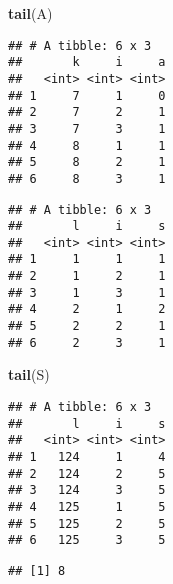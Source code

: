 \documentclass[
]{book}
\newenvironment{Shaded}{\begin{snugshade}}{\end{snugshade}}
\newcommand{\CommentTok}[1]{\textcolor[rgb]{0.56,0.35,0.01}{\textit{#1}}}
\newcommand{\FunctionTok}[1]{\textcolor[rgb]{0.13,0.29,0.53}{\textbf{#1}}}
\newcommand{\NormalTok}[1]{#1}
\newcommand{\OtherTok}[1]{\textcolor[rgb]{0.56,0.35,0.01}{#1}}
\newcommand{\SpecialCharTok}[1]{\textcolor[rgb]{0.81,0.36,0.00}{\textbf{#1}}}
\begin{document}
\begin{Shaded}
\begin{Highlighting}[]
\FunctionTok{tail}\NormalTok{(A)}
\end{Highlighting}
\end{Shaded}

\begin{verbatim}
## # A tibble: 6 x 3
##       k     i     a
##   <int> <int> <int>
## 1     7     1     0
## 2     7     2     1
## 3     7     3     1
## 4     8     1     1
## 5     8     2     1
## 6     8     3     1
\end{verbatim}

\begin{Shaded}
\end{Shaded}

\begin{verbatim}
## # A tibble: 6 x 3
##       l     i     s
##   <int> <int> <int>
## 1     1     1     1
## 2     1     2     1
## 3     1     3     1
## 4     2     1     2
## 5     2     2     1
## 6     2     3     1
\end{verbatim}

\begin{Shaded}
\begin{Highlighting}[]
\FunctionTok{tail}\NormalTok{(S)}
\end{Highlighting}
\end{Shaded}

\begin{verbatim}
## # A tibble: 6 x 3
##       l     i     s
##   <int> <int> <int>
## 1   124     1     4
## 2   124     2     5
## 3   124     3     5
## 4   125     1     5
## 5   125     2     5
## 6   125     3     5
\end{verbatim}

\begin{Shaded}
\end{Shaded}

\begin{verbatim}
## [1] 8
\end{verbatim}
\end{document}
